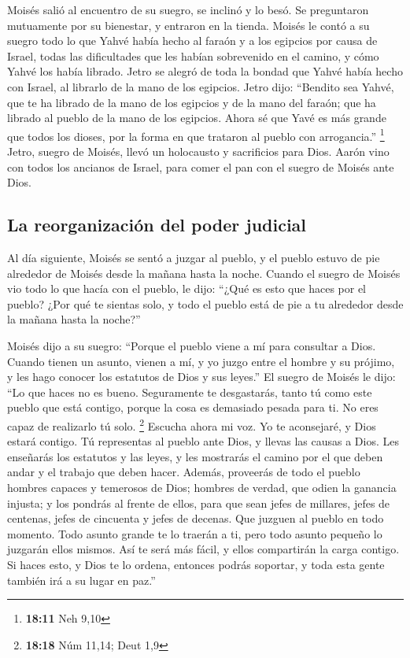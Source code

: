 \begin{paracol}{2}
 Moisés salió al encuentro de su suegro, se inclinó y lo
besó. Se preguntaron mutuamente por su bienestar, y entraron en la
tienda.  Moisés le contó a su suegro todo lo que Yahvé
había hecho al faraón y a los egipcios por causa de Israel, todas las
dificultades que les habían sobrevenido en el camino, y cómo Yahvé los
había librado.  Jetro se alegró de toda la bondad que
Yahvé había hecho con Israel, al librarlo de la mano de los egipcios.
 Jetro dijo: ``Bendito sea Yahvé, que te ha librado de la
mano de los egipcios y de la mano del faraón; que ha librado al pueblo
de la mano de los egipcios.  Ahora sé que Yavé es más
grande que todos los dioses, por la forma en que trataron al pueblo con
arrogancia.'' \footnote{\textbf{18:11} Neh 9,10}  Jetro,
suegro de Moisés, llevó un holocausto y sacrificios para Dios. Aarón
vino con todos los ancianos de Israel, para comer el pan con el suegro
de Moisés ante Dios.

\hypertarget{la-reorganizaciuxf3n-del-poder-judicial}{%
\subsection{La reorganización del poder
judicial}\label{la-reorganizaciuxf3n-del-poder-judicial}}

 Al día siguiente, Moisés se sentó a juzgar al pueblo, y
el pueblo estuvo de pie alrededor de Moisés desde la mañana hasta la
noche.  Cuando el suegro de Moisés vio todo lo que hacía
con el pueblo, le dijo: ``¿Qué es esto que haces por el pueblo? ¿Por qué
te sientas solo, y todo el pueblo está de pie a tu alrededor desde la
mañana hasta la noche?''

 Moisés dijo a su suegro: ``Porque el pueblo viene a mí
para consultar a Dios.  Cuando tienen un asunto, vienen a
mí, y yo juzgo entre el hombre y su prójimo, y les hago conocer los
estatutos de Dios y sus leyes.''  El suegro de Moisés le
dijo: ``Lo que haces no es bueno.  Seguramente te
desgastarás, tanto tú como este pueblo que está contigo, porque la cosa
es demasiado pesada para ti. No eres capaz de realizarlo tú solo.
\footnote{\textbf{18:18} Núm 11,14; Deut 1,9}  Escucha
ahora mi voz. Yo te aconsejaré, y Dios estará contigo. Tú representas al
pueblo ante Dios, y llevas las causas a Dios.  Les
enseñarás los estatutos y las leyes, y les mostrarás el camino por el
que deben andar y el trabajo que deben hacer.  Además,
proveerás de todo el pueblo hombres capaces y temerosos de Dios; hombres
de verdad, que odien la ganancia injusta; y los pondrás al frente de
ellos, para que sean jefes de millares, jefes de centenas, jefes de
cincuenta y jefes de decenas.  Que juzguen al pueblo en
todo momento. Todo asunto grande te lo traerán a ti, pero todo asunto
pequeño lo juzgarán ellos mismos. Así te será más fácil, y ellos
compartirán la carga contigo.  Si haces esto, y Dios te
lo ordena, entonces podrás soportar, y toda esta gente también irá a su
lugar en paz.''


\end{paracol}
